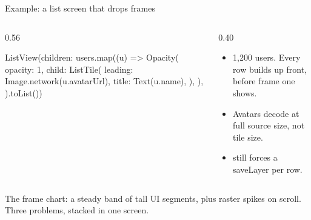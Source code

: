 \documentclass[10pt,aspectratio=169,t]{beamer}
\begin{document}
\begin{frame}[fragile,eyebrow=Profiling]{Example: a list screen that drops frames}
  \begin{columns}[T]
    \begin{column}{0.56\textwidth}
\begin{dart}
ListView(children: users.map((u) =>
  Opacity(
    opacity: 1,
    child: ListTile(
      leading: Image.network(u.avatarUrl),
      title: Text(u.name),
    ),
  ),
).toList())
\end{dart}
    \end{column}
    \begin{column}{0.40\textwidth}
      \begin{itemize}
        \item 1,200 users. Every row builds up front, before frame one shows.
        \item Avatars decode at full source size, not tile size.
        \item {} still forces a saveLayer per row.
      \end{itemize}
    \end{column}
  \end{columns}
  \begin{takeaway}{The frame chart: a steady band of tall UI segments, plus raster spikes on scroll.}
    Three problems, stacked in one screen.
  \end{takeaway}
\end{frame}
\end{document}
